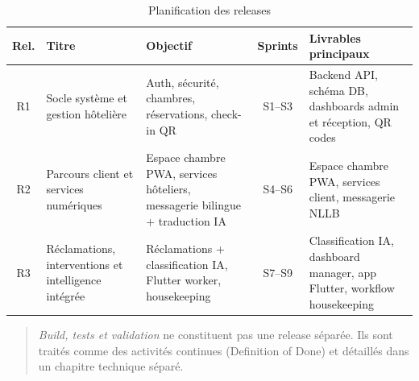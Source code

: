 
\begin{table}[H]
\centering
\caption{Planification des releases}
\label{tab:releases}
\small
\begin{tabular}{|c|p{3.5cm}|p{4.5cm}|c|p{4cm}|}
\hline
\textbf{Rel.} & \textbf{Titre} & \textbf{Objectif} & \textbf{Sprints} & \textbf{Livrables principaux} \\
\hline
R1 & Socle système et gestion hôtelière & Auth, sécurité, chambres, réservations, check-in QR & S1--S3 & Backend API, schéma DB, dashboards admin et réception, QR codes \\
\hline
R2 & Parcours client et services numériques & Espace chambre PWA, services hôteliers, messagerie bilingue + traduction IA & S4--S6 & Espace chambre PWA, services client, messagerie NLLB \\
\hline
R3 & Réclamations, interventions et intelligence intégrée & Réclamations + classification IA, Flutter worker, housekeeping & S7--S9 & Classification IA, dashboard manager, app Flutter, workflow housekeeping \\
\hline
\end{tabular}
\end{table}

\begin{quote}
\textit{Build, tests et validation} ne constituent pas une release séparée. Ils sont traités comme des activités continues (Definition of Done) et détaillés dans un chapitre technique séparé.
\end{quote}
